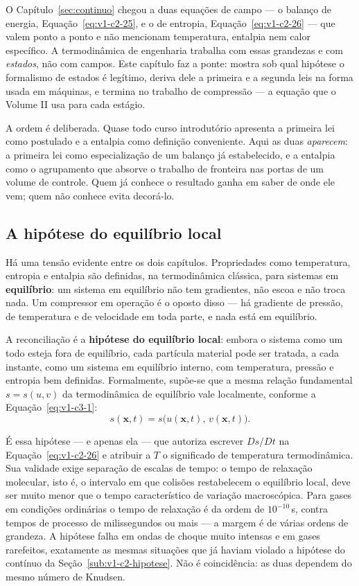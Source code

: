 \documentclass[12pt,a4paper]{article}
\numberwithin{equation}{section}
\numberwithin{table}{section}
\numberwithin{figure}{section}
\begin{document}
O Capítulo~\ref{sec:continuo} chegou a duas equações de campo --- o balanço de
energia, Equação~\eqref{eq:v1-c2-25}, e o de entropia,
Equação~\eqref{eq:v1-c2-26} --- que valem ponto a ponto e não mencionam
temperatura, entalpia nem calor específico. A termodinâmica de engenharia
trabalha com essas grandezas e com \emph{estados}, não com campos. Este
capítulo faz a ponte: mostra sob qual hipótese o formalismo de estados é
legítimo, deriva dele a primeira e a segunda leis na forma usada em máquinas, e
termina no trabalho de compressão --- a equação que o Volume II usa para cada
estágio.

A ordem é deliberada. Quase todo curso introdutório apresenta a primeira lei
como postulado e a entalpia como definição conveniente. Aqui as duas
\emph{aparecem}: a primeira lei como especialização de um balanço já
estabelecido, e a entalpia como o agrupamento que absorve o trabalho de
fronteira nas portas de um volume de controle. Quem já conhece o resultado
ganha em saber de onde ele vem; quem não conhece evita decorá-lo.

\subsection{A hipótese do equilíbrio local}\label{sub:v1-c3-equilibrio}

Há uma tensão evidente entre os dois capítulos. Propriedades como temperatura,
entropia e entalpia são definidas, na termodinâmica clássica, para sistemas em
\textbf{equilíbrio}: um sistema em equilíbrio não tem gradientes, não escoa e
não troca nada. Um compressor em operação é o oposto disso --- há gradiente de
pressão, de temperatura e de velocidade em toda parte, e nada está em
equilíbrio.

A reconciliação é a \textbf{hipótese do equilíbrio local}: embora o sistema
como um todo esteja fora de equilíbrio, cada partícula material pode ser
tratada, a cada instante, como um sistema em equilíbrio interno, com
temperatura, pressão e entropia bem definidas. Formalmente, supõe-se que a
mesma relação fundamental $s = s(u,v)$ da termodinâmica de equilíbrio vale
localmente, conforme a Equação~\eqref{eq:v1-c3-1}:
\begin{equation}\label{eq:v1-c3-1}
s(\mathbf{x},t) = s\big(u(\mathbf{x},t),\, v(\mathbf{x},t)\big).
\end{equation}

É essa hipótese --- e apenas ela --- que autoriza escrever $Ds/Dt$ na
Equação~\eqref{eq:v1-c2-26} e atribuir a $T$ o significado de temperatura
termodinâmica. Sua validade exige separação de escalas de tempo: o tempo de
relaxação molecular, isto é, o intervalo em que colisões restabelecem o
equilíbrio local, deve ser muito menor que o tempo característico de variação
macroscópica. Para gases em condições ordinárias o tempo de relaxação é da
ordem de $10^{-10}\,$s, contra tempos de processo de milissegundos ou mais
--- a margem é de várias ordens de grandeza. A hipótese falha em ondas de
choque muito intensas e em gases rarefeitos, exatamente as mesmas situações
que já haviam violado a hipótese do contínuo da
Seção~\ref{sub:v1-c2-hipotese}. Não é coincidência: as duas dependem do mesmo
número de Knudsen.
\end{document}
